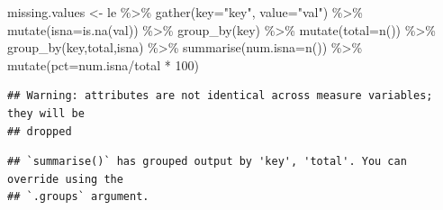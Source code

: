 \documentclass[
]{article}
\newenvironment{Shaded}{\begin{snugshade}}{\end{snugshade}}
\newcommand{\AttributeTok}[1]{\textcolor[rgb]{0.77,0.63,0.00}{#1}}
\newcommand{\DecValTok}[1]{\textcolor[rgb]{0.00,0.00,0.81}{#1}}
\newcommand{\FunctionTok}[1]{\textcolor[rgb]{0.00,0.00,0.00}{#1}}
\newcommand{\NormalTok}[1]{#1}
\newcommand{\OtherTok}[1]{\textcolor[rgb]{0.56,0.35,0.01}{#1}}
\newcommand{\SpecialCharTok}[1]{\textcolor[rgb]{0.00,0.00,0.00}{#1}}
\newcommand{\StringTok}[1]{\textcolor[rgb]{0.31,0.60,0.02}{#1}}
\begin{document}
\begin{Shaded}
\begin{Highlighting}[]
\NormalTok{missing.values }\OtherTok{\textless{}{-}}\NormalTok{ le }\SpecialCharTok{\%\textgreater{}\%}
  \FunctionTok{gather}\NormalTok{(}\AttributeTok{key=}\StringTok{"key"}\NormalTok{, }\AttributeTok{value=}\StringTok{"val"}\NormalTok{) }\SpecialCharTok{\%\textgreater{}\%}
  \FunctionTok{mutate}\NormalTok{(}\AttributeTok{isna=}\FunctionTok{is.na}\NormalTok{(val)) }\SpecialCharTok{\%\textgreater{}\%}
  \FunctionTok{group\_by}\NormalTok{(key) }\SpecialCharTok{\%\textgreater{}\%}
  \FunctionTok{mutate}\NormalTok{(}\AttributeTok{total=}\FunctionTok{n}\NormalTok{()) }\SpecialCharTok{\%\textgreater{}\%}
  \FunctionTok{group\_by}\NormalTok{(key,total,isna) }\SpecialCharTok{\%\textgreater{}\%}
  \FunctionTok{summarise}\NormalTok{(}\AttributeTok{num.isna=}\FunctionTok{n}\NormalTok{()) }\SpecialCharTok{\%\textgreater{}\%}
  \FunctionTok{mutate}\NormalTok{(}\AttributeTok{pct=}\NormalTok{num.isna}\SpecialCharTok{/}\NormalTok{total }\SpecialCharTok{*} \DecValTok{100}\NormalTok{)}
\end{Highlighting}
\end{Shaded}

\begin{verbatim}
## Warning: attributes are not identical across measure variables; they will be
## dropped
\end{verbatim}

\begin{verbatim}
## `summarise()` has grouped output by 'key', 'total'. You can override using the
## `.groups` argument.
\end{verbatim}
\end{document}
